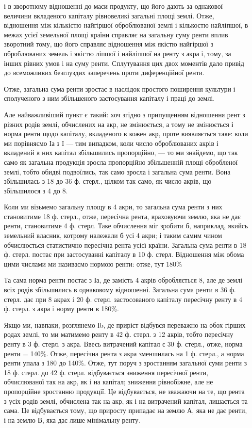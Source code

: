 \parcont{}  %
і в зворотному відношенні до маси продукту, що його дають за однакової величини
вкладеного капіталу рівновеликі загальні площі землі. Отже, відношення між
кількістю найгіршої оброблюваної землі і кількостю найліпшої, в межах усієї
земельної площі країни справляє на загальну суму ренти вплив зворотний
тому, що його справляє відношення між якістю найгіршої з оброблюваних земель
і якістю ліпшої і найліпшої на ренту з акра і, тому, за інших рівних
умов і на суму ренти. Сплутування цих двох моментів дало привід до всеможливих
безглуздих заперечень проти диференційної ренти.

Отже, загальна сума ренти зростає в наслідок простого поширення культури
і сполученого з ним збільшеного застосування капіталу і праці до землі.

Але найважливіший пункт є такий: хоч згідно з припущенням відношення
рент з різних родів землі, обчислених на акр, не змінюється, а тому
не змінюється і норма ренти щодо капіталу, вкладеного в кожен акр, проте
виявляється таке: коли ми порівняємо Іа з І — тим випадком, коли число оброблюваних
акрів і вкладений в них капітал збільшились пропорційно, — то ми знайдемо,
що так само як загальна продукція зросла пропорційно збільшенній площі
обробленої землі, тобто обидві подвоїлись, так само зросла і загальна сума ренти.
Вона збільшилась з 18 до 36 ф. стерл., цілком так само, як число акрів, що
збільшилося з 4 до 8.

Коли ми візьмемо загальну площу в 4 акри, то загальна сума ренти з них
становитиме 18 ф. стерл., отже, пересічна рента, враховуючи землю, яка не дає
ренти, становитиме 4 ф. стерл. Таке обчислення міг зробити б, наприклад,
якийсь земельний власник, котрому належали б усі 4 акри; і таким самим
чином обчислюється статистично пересічна рента усієї країни. Загальна сума
ренти в 18 ф. стерл. постає при застосуванні капіталу в 10 ф. стерл.
Відношення між обома цими числами ми називаємо нормою ренти: отже, тут
180\%

Та сама норма ренти постає з Іа, де замість 4 акрів обробляється 8,
але де землі всіх родів збільшились в однаковому відношенні. Загальна сума
ренти в 36 ф. стерл. дає при 8 акрах і 20 ф. стерл. застосованого капіталу
пересічну ренту в 4 ф. стерл. з акра і норму ренти в 180\%.

Якщо ми, навпаки, розглянемо Іb, де приріст відбувся переважно на обох
гірших родах землі, то ми матимемо ренту в 42 ф. стерл. з 12 акрів, тобто
пересічну ренту в 3 ф. стерл. з акра. Ввесь витрачений капітал є 30 ф. стерл.,
отже, норма ренти = 140\%. Отже, пересічна рента з акра зменшилась на 1 ф.
стерл., а норма ренти упала з 180 до 140\%. Отже, тут поруч з зростанням
загальної суми ренти з 18 ф. стерл. до 42 ф. стерл. відбувається зниження
пересічної ренти, обчислюваної так на акр, як і на капітал; зниження рівнобіжне,
але не пропорційне зростанню продукції. Це відбувається, не зважаючи на те,
що рента з усіх родів землі, обчислена так на акр, як і на витрачений капітал,
лишається та сама. Це відбувається тому, що  приросту припадає на
землю А, яка не дає ренти, і на землю В, яка дає лише мінімальну ренту.


